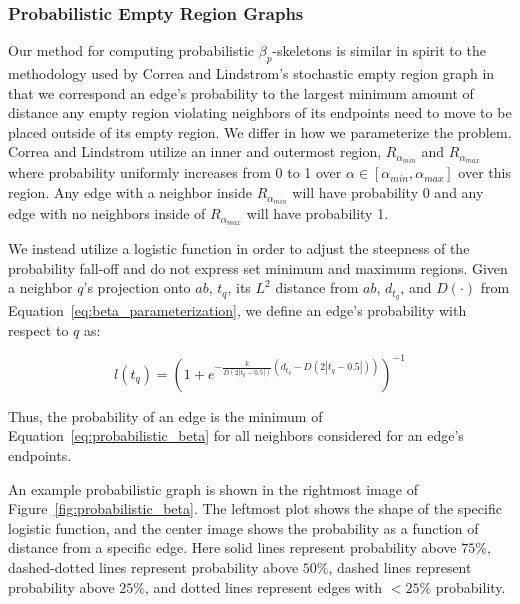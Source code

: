 \subsubsection{Probabilistic Empty Region Graphs}

Our method for computing probabilistic $\beta_p$-skeletons is similar in spirit to the methodology used by Correa and Lindstrom's stochastic empty region graph in that we correspond an edge's probability to the largest minimum amount of distance any empty region violating neighbors of its endpoints need to move to be placed outside of its empty region.
%
%
We differ in how we parameterize the problem.
%
Correa and Lindstrom utilize an inner and outermost region, $R_{\alpha_{min}}$ and $R_{\alpha_{max}}$ where probability uniformly increases from 0 to 1 over $\alpha \in [\alpha_{min},\alpha_{max}]$ over this region.
%
Any edge with a neighbor inside $R_{\alpha_{min}}$ will have probability 0 and any edge with no neighbors inside of $R_{\alpha_{max}}$ will have probability 1.

We instead utilize a logistic function in order to adjust the steepness of the probability fall-off and do not express set minimum and maximum regions.
%
Given a neighbor $q$'s projection onto $ab$, $t_q$, its $L^2$ distance from $ab$, $d_{t_q}$, and $D(\cdot)$ from Equation~\ref{eq:beta_parameterization}, we define an edge's probability with respect to $q$ as:

\begin{equation}
\label{eq:probabilistic_beta}
    l(t_q) = \left(1 + e^{-\frac{k}{D(2|t_q - 0.5|)}\left(d_{t_q}-D(2|t_q - 0.5|)\right)}\right)^{-1}
\end{equation}

Thus, the probability of an edge is the minimum of Equation~\ref{eq:probabilistic_beta} for all neighbors considered for an edge's endpoints.
%

An example probabilistic graph is shown in the rightmost image of Figure~\ref{fig:probabilistic_beta}.
%
The leftmost plot shows the shape of the specific logistic function, and the center image shows the probability as a function of distance from a specific edge.
%
Here solid lines represent probability above $75\%$, dashed-dotted lines represent probability above $50\%$, dashed lines represent probability above $25\%$, and dotted lines represent edges with $<25\%$ probability.

